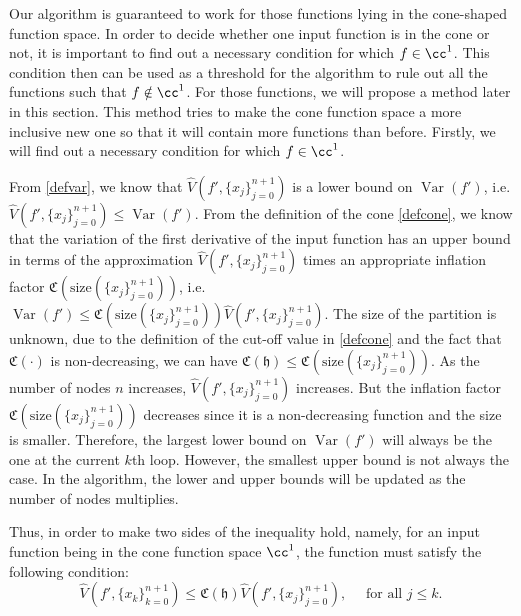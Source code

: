 \documentclass[draft]{iitthesis}
\DeclareMathOperator{\Var}{Var}
\theoremstyle{definition}
\theoremstyle{remark}
\begin{document}

Our algorithm is guaranteed to work for those functions lying in the cone-shaped function space. In order to decide whether one input function is in the cone or not, it is important to find out a necessary condition for which $f\in\cc^1$. This condition then can be used as a threshold for the algorithm to rule out all the functions such that $f\notin\cc^1$. For those functions, we will propose a method later in this section. This method tries to make the cone function space a more inclusive new one so that it will contain more functions than before. Firstly, we will find out a necessary condition for which $f\in\cc^1$.

From \eqref{defvar}, we know that $\widehat{V}({f'},\{x_j\}_{j=0}^{n+1})$ is a lower bound on $\Var({f'})$, i.e. $\widehat{V}({f'},\{x_j\}_{j=0}^{n+1})\leq \Var({f'})$. From the definition of the cone \eqref{defcone}, we know that the variation of the first derivative of the input function has an upper bound in terms of the approximation $\widehat{V}({f'},\{x_j\}_{j=0}^{n+1})$ times an appropriate inflation factor $\mathfrak{C}(\text{size}(\{x_j\}_{j=0}^{n+1}))$, i.e. $\Var({f'})\leq \mathfrak{C}(\text{size}(\{x_j\}_{j=0}^{n+1}))\widehat{V}({f'},\{x_j\}_{j=0}^{n+1})$. The size of the partition is unknown, due to the definition of the cut-off value in \eqref{defcone} and the fact that $\mathfrak{C}(\cdot)$ is non-decreasing, we can have $\mathfrak{C}(\mathfrak{h})\leq \mathfrak{C}(\text{size}(\{x_j\}_{j=0}^{n+1}))$. 
As the number of nodes $n$ increases, $\widehat{V}({f'},\{x_j\}_{j=0}^{n+1})$ increases. But the inflation factor $\mathfrak{C}(\text{size}(\{x_j\}_{j=0}^{n+1}))$ decreases since it is a non-decreasing function and the size is smaller. Therefore, the largest lower bound on $\Var(f')$ will always be the one at the current $k$th loop. However, the smallest upper bound is not always the case. In the algorithm, the lower and upper bounds will be updated as the number of nodes multiplies.

Thus, in order to make two sides of the inequality hold, namely, for an input function being in the cone function space $\cc^1$, the function must satisfy the following condition:
\begin{equation}\label{neccontrap}
    \widehat{V}({f'},\{x_k\}_{k=0}^{n+1})\leq\mathfrak{C}(\mathfrak{h})\widehat{V}({f'},\{x_j\}_{j=0}^{n+1}), \quad \text{ for all } j \leq k.
\end{equation}
\end{document}
